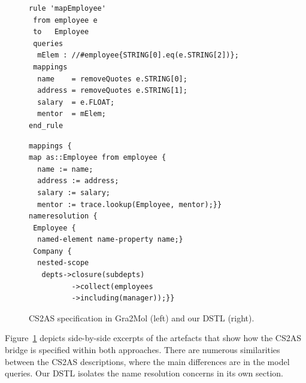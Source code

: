 \documentclass{llncs}
\makeatletter
\newenvironment{SubFloat}[2][]%
{\def\sf@one{#1}%
	\def\sf@two{#2}%
	\setbox\sf@box\hbox%
	\bgroup}%
{ \egroup%
	\ifx\@empty\sf@two\@empty\relax%
	\def\sf@two{\@empty}%
	\fi%
	\ifx\@empty\sf@one\@empty\relax%
	\subfloat[\sf@two]{\box\sf@box}%
	\else%
	\subfloat[\sf@one][\sf@two]{\box\sf@box}%
	\fi%
}%
\makeatother
\begin{document}
\begin{figure}[htbp]
	\captionsetup[subfigure]{labelformat=empty}
	\centering
  	\begin{SubFloat}[]{}
  	  \begin{minipage}{0.45\textwidth}
		\centering
		\begin{lstlisting}[label=lst:Gra2MolExampleGrammar, language=gra2mol]
rule 'mapEmployee'
 from employee e
 to   Employee
 queries
  mElem : //#employee{STRING[0].eq(e.STRING[2])};
 mappings
  name    = removeQuotes e.STRING[0];
  address = removeQuotes e.STRING[1];
  salary  = e.FLOAT;
  mentor  = mElem;
end_rule
		\end{lstlisting} 
      \end{minipage}
    \end{SubFloat}	
  \hfill  
	\begin{SubFloat}[]{}
	  \begin{minipage}{0.45\textwidth}
		\centering
		\begin{lstlisting}[label=lst:DstlExampleGrammar, language=CS2AS]
mappings {
map as::Employee from employee {
  name := name;
  address := address;
  salary := salary;
  mentor := trace.lookup(Employee, mentor);}} 
nameresolution {
 Employee {
  named-element name-property name;}
 Company {
  nested-scope
   depts->closure(subdepts)
          ->collect(employees
          ->including(manager));}}
		\end{lstlisting}
      \end{minipage}
	\end{SubFloat}
 
	\caption{CS2AS specification in Gra2Mol (left) and our DSTL (right).}
	\label{fig:CompaniesCS2AS}
\end{figure}


Figure~\ref{fig:CompaniesCS2AS} depicts side-by-side excerpts of the artefacts that show how the CS2AS bridge is specified within both approaches. There are numerous similarities between the CS2AS descriptions, where the main differences are in the model queries. Our DSTL isolates the name resolution concerns in its own section.


\end{document}
